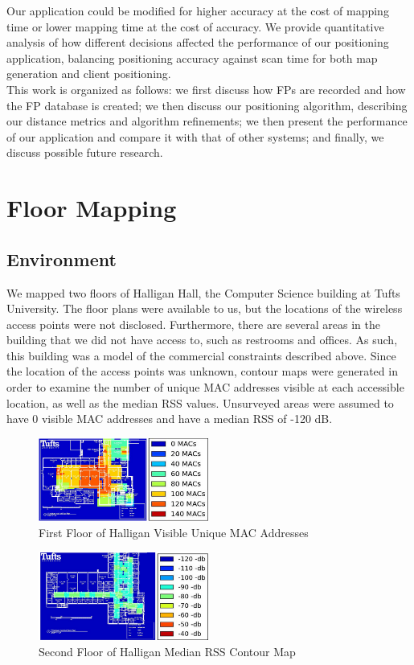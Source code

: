 \documentclass[conference]{IEEEtran}
\begin{document}
\indent Our application could be modified for higher accuracy at the cost of mapping time or lower mapping time at the cost of accuracy. We provide quantitative analysis of how different decisions affected the performance of our positioning application, balancing positioning accuracy against scan time for both map generation and client positioning. \\
\indent This work is organized as follows: we first discuss how FPs are recorded and how the FP database is created; we then discuss our positioning algorithm, describing our distance metrics and algorithm refinements; we then present the performance of our application and compare it with that of other systems; and finally, we discuss possible future research.

\section{Floor Mapping}
\subsection{Environment}
We mapped two floors of Halligan Hall, the Computer Science building at Tufts University. The floor plans were available to us, but the locations of the wireless access points were not disclosed. Furthermore, there are several areas in the building that we did not have access to, such as restrooms and offices. As such, this building was a model of the commercial constraints described above. Since the location of the access points was unknown, contour maps were generated in order to examine the number of unique MAC addresses visible at each accessible location, as well as the median RSS values. Unsurveyed areas were assumed to have 0 visible MAC addresses and have a median RSS of -120 dB. 
 
\begin{figure}[h!]
  \centering
    \includegraphics[width=0.5\textwidth]{APContour}
    \caption{First Floor of Halligan Visible Unique MAC Addresses}
\end{figure}


\begin{figure}[h!]
  \centering
    \includegraphics[width=0.5\textwidth]{dbContour}
   \caption{Second Floor of Halligan Median RSS Contour Map}
\end{figure}
\end{document}
